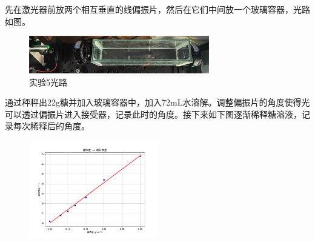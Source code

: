 \documentclass{ctexart}
\begin{document}
先在激光器前放两个相互垂直的线偏振片，然后在它们中间放一个玻璃容器，光路如图。
\begin{figure}[H]
    \centering
    \includegraphics[width=0.7\textwidth]{糖光路(1).jpg}
    \caption{实验5光路}
\end{figure}
通过秤秤出22g糖并加入玻璃容器中，加入72mL水溶解。调整偏振片的角度使得光可以透过偏振片进入接受器，记录此时的角度。接下来如下图逐渐稀释糖溶液，记录每次稀释后的角度。
\begin{figure}[H]
    \centering
    \includegraphics[width=0.5\textwidth]{糖浓度 vs 旋转角度.png}
\end{figure}
\end{document}

